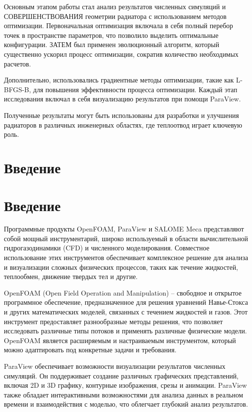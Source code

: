 \documentclass[a4paper,12pt]{article}
\theoremstyle{plain} %
\theoremstyle{definition} %
\theoremstyle{remark} %
\begin{document}
Основным этапом работы стал анализ результатов численных симуляций и СОВЕРШЕНСТВОВАНИЯ геометрии радиатора с использованием методов оптимизации. Первоначальная оптимизация включала в себя полный перебор точек в пространстве параметров, что позволило выделить оптимальные конфигурации. ЗАТЕМ был применен эволюционный алгоритм, который существенно ускорил процесс оптимизации, сократив количество необходимых расчетов.

Дополнительно, использовались градиентные методы оптимизации, такие как L-BFGS-B, для повышения эффективности процесса оптимизации. Каждый этап исследования включал в себя визуализацию результатов при помощи ParaView.

Полученные результаты могут быть использованы для разработки и улучшения радиаторов в различных инженерных областях, где теплоотвод играет ключевую роль.

\newpage 
\tableofcontents
\setcounter{page}{3}

\newpage
\section{Введение}


\section{Введение}

Программные продукты OpenFOAM, ParaView и SALOME Meca представляют собой мощный инструментарий, широко используемый в области вычислительной гидрогазодинамики (CFD) и численного моделирования. Совместное использование этих инструментов обеспечивает комплексное решение для анализа и визуализации сложных физических процессов, таких как течение жидкостей, теплообмен, движение твердых тел и другие.

OpenFOAM (Open Field Operation and Manipulation) -- свободное и открытое программное обеспечение, предназначенное для решения уравнений Навье-Стокса и других математических моделей, связанных с течением жидкостей и газов. Этот инструмент предоставляет разнообразные методы решения, что позволяет исследовать различные типы потоков и применять различные физические модели. OpenFOAM является расширяемым и настраиваемым инструментом, который можно адаптировать под конкретные задачи и требования.

ParaView обеспечивает возможности визуализации результатов численных симуляций. Он поддерживает создание различных графических представлений, включая 2D и 3D графику, контурные изображения, срезы и анимации. ParaView также обладает интерактивными возможностями для анализа данных в реальном времени и взаимодействия с моделью, что облегчает глубокий анализ результатов.
\end{document}

